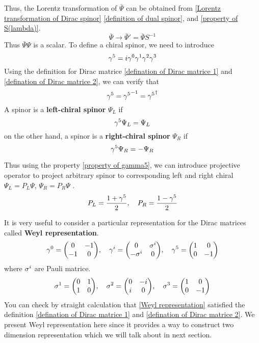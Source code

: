 Thus, the Lorentz transformation of $\bar{\Psi}$ can be obtained from \eqref{Lorentz transformation of Dirac spinor}  \eqref{definition of dual spinor}, and \eqref{property of S(lambda)}.
\begin{equation} \label{Lorentz transformation of barPsi}
\bar\Psi \rightarrow \bar{\Psi}' = \bar{\Psi}S^{-1}
\end{equation}
Thus $\bar{\Psi}\Psi$ is a scalar.
To define a chiral spinor, we need to introduce
\begin{equation}
  \gamma^5 = i\gamma^0\gamma^1\gamma^2\gamma^3
\end{equation}
Using the definition for Dirac matrice \eqref{defination of Dirac matrice 1} and \eqref{defination of Dirac matrice 2}, we can verify that
\begin{equation} \label{property of gamma5}
\gamma^5 ={\gamma^5}^{-1} = {\gamma^5}^{\dagger}
\end{equation}
A spinor is a \textbf{left-chiral spinor} $\Psi_L$ if
\begin{equation} \label{definition of left chiral spinor}
\gamma^5\Psi_L = \Psi_L
\end{equation}
on the other hand, a spinor is a \textbf{right-chiral spinor} $\Psi_R$ if
\begin{equation} \label{definition of right chiral spinor}
\gamma^5 \Psi_R = -\Psi_R
\end{equation}


Thus using the property \eqref{property of gamma5}, we can introduce projective operator to project arbitrary spinor to corresponding left and right chiral $\Psi_L = P_L\Psi$, $\Psi_R = P_R\Psi$ .
\begin{equation}
  P_L = \frac{1+\gamma^5}{2} ,\quad P_R = \frac{1-\gamma^5}{2}
\end{equation}

It is very useful to consider a particular representation for the Dirac matrices called \textbf{Weyl representation}.
\begin{equation} \label{Weyl representation}
\g^0 = \mqty(  0 & -1\\
-1 &  0),\quad
\g^i = \mqty(  0 &  \s^{i}\\
-\s^{i}&   0   ),\quad
\g^5 = \mqty(  1 &  0\\
0 & -1)
\end{equation}
where $\sigma^i$ are Pauli matrice.
\begin{equation} \label{Pauli matrice}
\s^1 = \mqty( 0 & 1 \\
1 & 0),\quad
\s^2 = \mqty( 0 & -i \\
i & 0),\quad
\s^3 = \mqty( 1 & 0 \\
0 & -1)
\end{equation}
You can check by straight calculation that \eqref{Weyl representation} satisfied the definition \eqref{defination of Dirac matrice 1} and \eqref{defination of Dirac matrice 2}. We present Weyl representation here since it provides a way to construct two dimension representation which we will talk about in next section.

